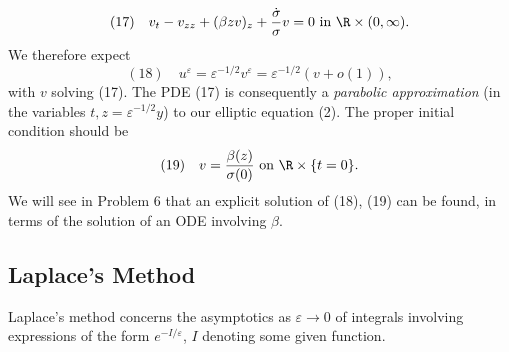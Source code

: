 \begin{example}
$$(17) \quad v_t - v_{zz} + (\beta z v)_z + \frac{\dot{\sigma}}{\sigma} v = 0 \text{ in } \R \times (0, \infty).$$
We therefore expect
$$(18) \quad u^{\varepsilon} = \varepsilon^{-1/2} v^{\varepsilon} = \varepsilon^{-1/2}(v + o(1)),$$
with $v$ solving (17). The PDE (17) is consequently a \textit{parabolic approximation} (in the variables $t, z = \varepsilon^{-1/2} y$) to our elliptic equation (2). The proper initial condition should be
$$(19) \quad v = \frac{\beta(z)}{\sigma(0)} \text{ on } \R \times \{t = 0\}.$$
We will see in Problem 6 that an explicit solution of (18), (19) can be found, in terms of the solution of an ODE involving $\beta$.
\end{example}

\subsection{Laplace's Method}
\label{sec:laplaces-method}

Laplace's method concerns the asymptotics as $\varepsilon \to 0$ of integrals involving expressions of the form $e^{-I/\varepsilon}$, $I$ denoting some given function.

